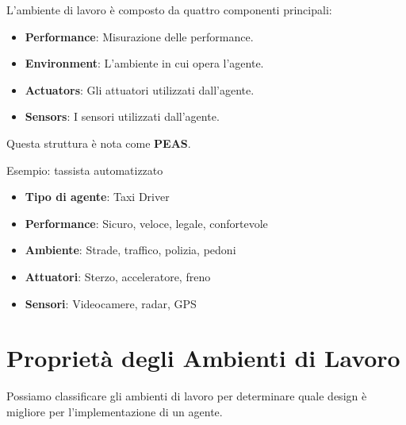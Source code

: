 L'ambiente di lavoro è composto da quattro componenti principali:

\begin{itemize}
	\item \textbf{Performance}: Misurazione delle performance.
	\item \textbf{\foreignlanguage{english}{Environment}}: L'ambiente in cui opera l'agente.
	\item \textbf{Actuators}: Gli attuatori utilizzati dall'agente.
	\item \textbf{Sensors}: I sensori utilizzati dall'agente.
\end{itemize}

Questa struttura è nota come \textbf{PEAS}.

Esempio: tassista automatizzato

\begin{itemize}
	\item \textbf{Tipo di agente}: Taxi Driver
	\item \textbf{Performance}: Sicuro, veloce, legale, confortevole
	\item \textbf{Ambiente}: Strade, traffico, polizia, pedoni
	\item \textbf{Attuatori}: Sterzo, acceleratore, freno
	\item \textbf{Sensori}: Videocamere, radar, GPS
\end{itemize}

\section{Proprietà degli Ambienti di Lavoro}

Possiamo classificare gli ambienti di lavoro per determinare quale design
è migliore per l'implementazione di un agente.

